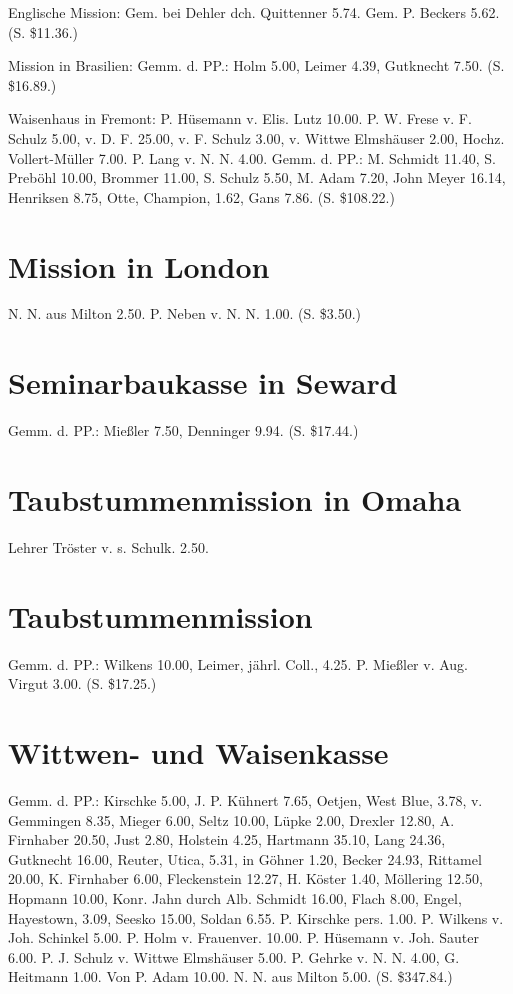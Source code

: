 Englische Mission: Gem. bei Dehler dch. Quittenner 5.74. Gem. P. Beckers 5.62. (S. \$11.36.)

Mission in Brasilien: Gemm. d. PP.: Holm 5.00, Leimer 4.39, Gutknecht 7.50. (S. \$16.89.)

Waisenhaus in Fremont: P. Hüsemann v. Elis. Lutz 10.00. P. W. Frese v. F. Schulz 5.00, v. D. F. 25.00, v. F. Schulz 3.00, v. Wittwe Elmshäuser 2.00, Hochz. Vollert-Müller 7.00. P. Lang v. N. N. 4.00. Gemm. d. PP.: M. Schmidt 11.40, S. Preböhl 10.00, Brommer 11.00, S. Schulz
5.50, M. Adam 7.20, John Meyer 16.14, Henriksen 8.75, Otte, Champion,
1.62, Gans 7.86. (S. \$108.22.)

\section{Mission in London}

N. N. aus Milton 2.50. P. Neben v. N. N. 1.00. (S. \$3.50.)

\section{Seminarbaukasse in Seward}

Gemm. d. PP.: Mießler 7.50, Denninger 9.94. (S. \$17.44.)

\section{Taubstummenmission in Omaha}

Lehrer Tröster v. s. Schulk. 2.50.

\section{Taubstummenmission}

Gemm. d. PP.: Wilkens 10.00, Leimer, jährl. Coll., 4.25. P. Mießler v. Aug. Virgut 3.00. (S. \$17.25.)

\section{Wittwen- und Waisenkasse}

Gemm. d. PP.: Kirschke 5.00, J. P. Kühnert 7.65, Oetjen, West Blue, 3.78, v. Gemmingen 8.35, Mieger 6.00, Seltz 10.00, Lüpke 2.00, Drexler 12.80, A. Firnhaber 20.50, Just 2.80, Holstein 4.25, Hartmann 35.10, Lang 24.36, Gutknecht 16.00, Reuter, Utica, 5.31, in Göhner 1.20, Becker 24.93, Rittamel 20.00, K. Firnhaber 6.00, Fleckenstein 12.27, H. Köster 1.40, Möllering 12.50, Hopmann 10.00, Konr. Jahn durch Alb. Schmidt 16.00, Flach 8.00, Engel, Hayestown, 3.09, Seesko 15.00, Soldan 6.55. P. Kirschke pers. 1.00. P. Wilkens v. Joh. Schinkel 5.00. P. Holm v. Frauenver. 10.00. P. Hüsemann v. Joh. Sauter 6.00. P. J. Schulz v. Wittwe Elmshäuser 5.00. P. Gehrke v. N. N. 4.00, G. Heitmann 1.00. Von P. Adam 10.00. N. N. aus Milton 5.00. (S. \$347.84.)

